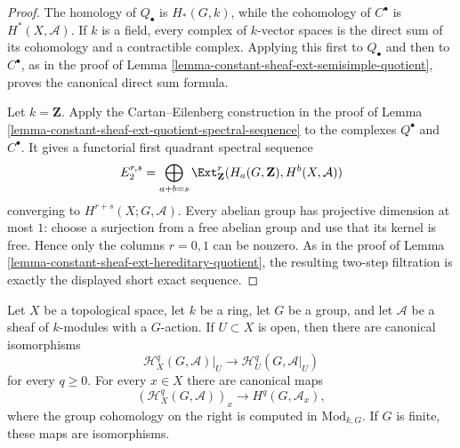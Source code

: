 \begin{proof}
The homology of $Q_\bullet$ is $H_*(G, k)$, while the cohomology of
$C^\bullet$ is $H^*(X, \mathcal{A})$. If $k$ is a field, every complex of
$k$-vector spaces is the direct sum of its cohomology and a contractible
complex. Applying this first to $Q_\bullet$ and then to $C^\bullet$, as in
the proof of Lemma
\ref{lemma-constant-sheaf-ext-semisimple-quotient}, proves the canonical
direct sum formula.

Let $k = \mathbf{Z}$. Apply the Cartan--Eilenberg construction in the proof
of Lemma \ref{lemma-constant-sheaf-ext-quotient-spectral-sequence} to the
complexes $Q^\bullet$ and $C^\bullet$. It gives a functorial first quadrant
spectral sequence
$$
E_2^{r, s} =
\bigoplus_{a + b = s}
\Ext_{\mathbf{Z}}^r(H_a(G, \mathbf{Z}), H^b(X, \mathcal{A}))
$$
converging to $H^{r + s}(X; G, \mathcal{A})$. Every abelian group has
projective dimension at most $1$: choose a surjection from a free abelian
group and use that its kernel is free. Hence only the columns $r = 0, 1$
can be nonzero. As in the proof of Lemma
\ref{lemma-constant-sheaf-ext-hereditary-quotient}, the resulting two-step
filtration is exactly the displayed short exact sequence.
\end{proof}

\begin{lemma}
\label{lemma-sheaf-group-cohomology-restriction}
\begin{reference}
\cite[Chapter IV, \S 4.4, discussion preceding Theorem 4.4.1,
p. 194]{Tohoku}
\end{reference}
Let $X$ be a topological space, let $k$ be a ring, let $G$ be a group,
and let $\mathcal{A}$ be a sheaf of $k$-modules with a $G$-action. If
$U \subset X$ is open, then there are canonical isomorphisms
$$
\mathcal{H}^q_X(G, \mathcal{A})|_U
\longrightarrow
\mathcal{H}^q_U(G, \mathcal{A}|_U)
$$
for every $q \geq 0$.
For every $x \in X$ there are canonical maps
$$
(\mathcal{H}^q_X(G, \mathcal{A}))_x
\longrightarrow H^q(G, \mathcal{A}_x),
$$
where the group cohomology on the right is computed in
$\text{Mod}_{k, G}$. If $G$ is finite, these maps are isomorphisms.
\end{lemma}

